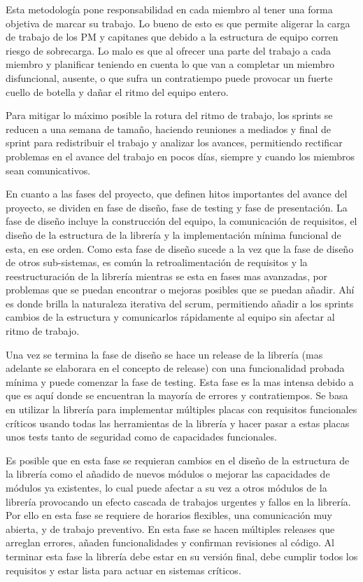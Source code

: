 \documentclass{report}
\begin{document}
Esta metodología pone responsabilidad en cada miembro al tener una forma objetiva de marcar su trabajo. Lo bueno de esto es que permite aligerar la carga de trabajo de los PM y capitanes que debido a la estructura de equipo corren riesgo de sobrecarga. Lo malo es que al ofrecer una parte del trabajo a cada miembro y planificar teniendo en cuenta lo que van a completar un miembro disfuncional, ausente, o que sufra un contratiempo puede provocar un fuerte cuello de botella y dañar el ritmo del equipo entero. \par
Para mitigar lo máximo posible la rotura del ritmo de trabajo, los sprints se reducen a una semana de tamaño, haciendo reuniones a mediados y final de sprint para redistribuir el trabajo y analizar los avances, permitiendo rectificar problemas en el avance del trabajo en pocos días, siempre y cuando los miembros sean comunicativos.
\par \vspace{0.3 cm}
En cuanto a las fases del proyecto, que definen hitos importantes del avance del proyecto, se dividen en fase de diseño, fase de testing y fase de presentación. La fase de diseño incluye la construcción del equipo, la comunicación de requisitos, el diseño de la estructura de la librería y la implementación mínima funcional de esta, en ese orden. Como esta fase de diseño sucede a la vez que la fase de diseño de otros sub-sistemas, es común la retroalimentación de requisitos y la reestructuración de la librería mientras se esta en fases mas avanzadas, por problemas que se puedan encontrar o mejoras posibles que se puedan añadir. Ahí es donde brilla la naturaleza iterativa del scrum, permitiendo añadir a los sprints cambios de la estructura y comunicarlos rápidamente al equipo sin afectar al ritmo de trabajo. \par \vspace{0.3 cm}
Una vez se termina la fase de diseño se hace un release de la librería (mas adelante se elaborara en el concepto de release) con una funcionalidad probada mínima y puede comenzar la fase de testing. Esta fase es la mas intensa debido a que es aquí donde se encuentran la mayoría de errores y contratiempos. Se basa en utilizar la librería para implementar múltiples placas con requisitos funcionales críticos usando todas las herramientas de la librería y hacer pasar a estas placas unos tests tanto de seguridad como de capacidades funcionales. \par
Es posible que en esta fase se requieran cambios en el diseño de la estructura de la librería como el añadido de nuevos módulos o mejorar las capacidades de módulos ya existentes, lo cual puede afectar a su vez a otros módulos de la librería provocando un efecto cascada de trabajos urgentes y fallos en la librería. Por ello en esta fase se requiere de horarios flexibles, una comunicación muy abierta, y de trabajo preventivo. En esta fase se hacen múltiples releases que arreglan errores, añaden funcionalidades y confirman revisiones al código. Al terminar esta fase la librería debe estar en su versión final, debe cumplir todos los requisitos y estar lista para actuar en sistemas críticos. \par \vspace{0.3 cm}
\end{document}
